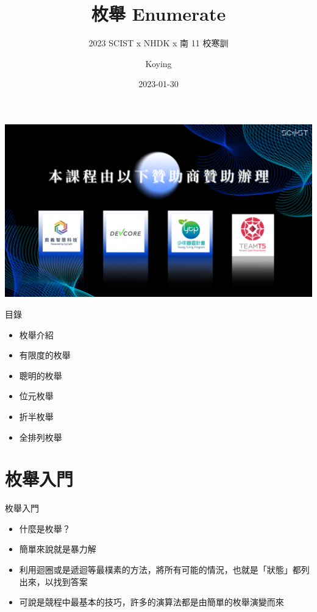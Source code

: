 \documentclass[aspectratio=169]{beamer}
\title{枚舉 Enumerate}
\subtitle{2023 SCIST x NHDK x 南 11 校寒訓}
\author{Koying}
\date{2023-01-30}
\begin{document}
    \begin{frame}
        \titlepage
    \end{frame}
    
    \begin{frame}
        \includegraphics[width=\textwidth]{./img/SCIST_Sponser.png}
    \end{frame}


    \begin{frame}{目錄}
        \begin{itemize}
            \item 枚舉介紹
            \item 有限度的枚舉
            \item 聰明的枚舉
            \item 位元枚舉
            \item 折半枚舉
            \item 全排列枚舉
        \end{itemize}
    \end{frame}

    \section{枚舉入門}

    \begin{frame}{枚舉入門}
        \begin{itemize}
            \item<1-> 什麼是枚舉？
            \item<2-> 簡單來說就是暴力解
            \item<3-> 利用迴圈或是遞迴等最樸素的方法，將所有可能的情況，也就是「狀態」都列出來，以找到答案
            \item<3-> 可說是競程中最基本的技巧，許多的演算法都是由簡單的枚舉演變而來
        \end{itemize}
    \end{frame}
\end{document}
